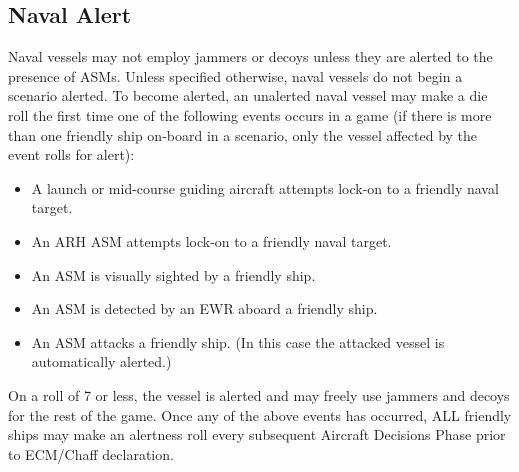 \subsection{Naval Alert}  Naval vessels may not employ jammers or decoys unless they are alerted to the presence of ASMs.  Unless specified otherwise, naval vessels do not begin a scenario alerted.  To become alerted, an unalerted naval vessel may make a die roll the first time one of the following events occurs in a game (if there is more than one friendly ship on-board in a scenario, only the vessel affected by the event rolls for alert):
\begin{itemize}
    \item A launch or mid-course guiding aircraft attempts lock-on to a friendly naval target.
    \item An ARH ASM attempts lock-on to a friendly naval target.
    \item An ASM is visually sighted by a friendly ship.
    \item An ASM is detected by an EWR aboard a friendly ship.
    \item An ASM attacks a friendly ship. (In this case the attacked vessel is automatically alerted.)
\end{itemize}
On a roll of 7 or less, the vessel is alerted and may freely use jammers and decoys for the rest of the game.  Once any of the above events has occurred, ALL friendly ships may make an alertness roll every subsequent Aircraft Decisions Phase prior to ECM/Chaff declaration.

